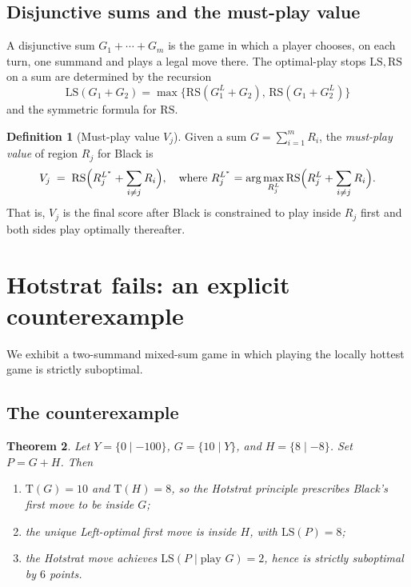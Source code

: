 \documentclass[11pt,a4paper]{amsart}
\newtheorem{theorem}{Theorem}[section]
\theoremstyle{definition}
\newtheorem{definition}[theorem]{Definition}
\theoremstyle{remark}
\newcommand{\LS}{\mathrm{LS}}
\newcommand{\RS}{\mathrm{RS}}
\newcommand{\Tt}{\mathrm{T}}
\begin{document}
\subsection{Disjunctive sums and the must-play value}

A disjunctive sum $G_1 + \cdots + G_m$ is the game in which a player
chooses, on each turn, one summand and plays a legal move there. The
optimal-play stops $\LS, \RS$ on a sum are determined by the recursion
\[
  \LS(G_1 + G_2) = \max\bigl\{
    \RS(G_1^L + G_2),\, \RS(G_1 + G_2^L)
  \bigr\}
\]
and the symmetric formula for $\RS$.

\begin{definition}[Must-play value $V_j$]\label{def:Vj}
Given a sum $G = \sum_{i=1}^m R_i$, the \emph{must-play value} of region
$R_j$ for Black is
\[
  V_j \;=\; \RS\Bigl( R_j^{L^*} + \sum_{i \neq j} R_i \Bigr),
  \quad\text{where }
  R_j^{L^*} = \arg\max_{R_j^L} \RS\Bigl( R_j^L + \sum_{i \neq j} R_i \Bigr).
\]
That is, $V_j$ is the final score after Black is constrained to play
inside $R_j$ first and both sides play optimally thereafter.
\end{definition}

\section{Hotstrat fails: an explicit counterexample}\label{sec:hotstrat}

We exhibit a two-summand mixed-sum game in which playing the locally
hottest game is strictly suboptimal.

\subsection{The counterexample}

\begin{theorem}\label{thm:hotstrat}
Let $Y = \{0 \mid -100\}$, $G = \{10 \mid Y\}$, and $H = \{8 \mid -8\}$.
Set $P = G + H$. Then
\begin{enumerate}[label=(\alph*)]
\item $\Tt(G) = 10$ and $\Tt(H) = 8$, so the Hotstrat principle prescribes
  Black's first move to be inside $G$;
\item the unique Left-optimal first move is inside $H$, with
  $\LS(P) = 8$;
\item the Hotstrat move achieves $\LS(P \mid \text{play } G) = 2$, hence
  is strictly suboptimal by $6$ points.
\end{enumerate}
\end{theorem}
\end{document}
